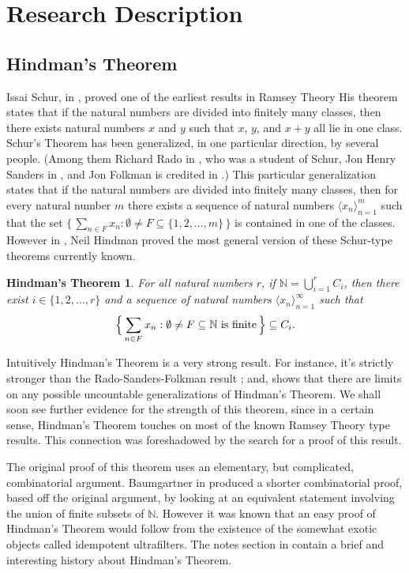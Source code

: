 \documentclass[12pt]{article}
\theoremstyle{plain}
\newtheorem{fst}[thm]{Hindman's Theorem}
\theoremstyle{definition}
\newcommand{\bbN}{\mathbb{N}}
\newcommand{\la}{\langle}
\newcommand{\ra}{\rangle}
\begin{document}
\section{Research Description}
\subsection{Hindman's Theorem}
Issai Schur, in \cite{Schur:1916fk}, proved one of the earliest
results in Ramsey Theory
His theorem states that if the natural numbers are divided into
finitely many classes, then there exists natural numbers $x$ and $y$
such that $x$, $y$, and $x+y$ all lie in one class.
Schur's Theorem has been generalized, in one particular direction, by
several people.
(Among them Richard Rado in \cite{Rado:1933kx}, who was a student of
Schur, Jon Henry Sanders in \cite{Sanders:1968uq}, and Jon Folkman is
credited in \cite{Graham:1971vn}.)
This particular generalization states that if the natural numbers are
divided into finitely many classes, then for every natural number $m$
there exists a sequence of natural numbers $\la x_n \ra_{n=1}^m$ such
that the set $\bigl\{\, \sum_{n \in F} x_n : \emptyset \ne F \subseteq \{1,
2, \ldots, m\} \,\bigr\}$ is contained in one of the classes.
However in \cite{Hindman:1974ys}, Neil Hindman proved the most general
version of these Schur-type theorems currently known. 

  \begin{fst}
    For all natural numbers $r$, if \/ $\bbN = \bigcup_{i=1}^r C_i$, then
    there exist $i \in \{1, 2, \ldots, r\}$ and a sequence of natural
    numbers $\la x_n \ra_{n=1}^\infty$ such that
      \[
        \Bigl\{\, \sum_{n\in F} x_n : \emptyset \ne F \subseteq \bbN
        \hbox{ is finite} \,\Bigr\} \subseteq C_i.
      \]
  \end{fst}

Intuitively Hindman's Theorem is a very strong result.
For instance, it's strictly stronger than the Rado-Sanders-Folkman
result \cite[Theorems 16.28 and 16.29]{Hindman:1998fk}; and,
\cite{Milliken:1978fk} shows that there are limits on any possible
uncountable generalizations of Hindman's Theorem. 
We shall soon see further evidence for the strength of this theorem,
since in a certain sense, Hindman's Theorem touches on most of the
known Ramsey Theory type results. 
This connection was foreshadowed by the search for a proof of this
result. 

The original proof of this theorem uses an elementary, but
complicated, combinatorial argument. 
Baumgartner in \cite{Baumgartner:1974uq} produced a shorter
combinatorial proof, based off the original argument, by looking at an
equivalent statement involving the union of finite subsets of $\bbN$. 
However it was known that an easy proof of Hindman's Theorem would
follow from the existence of the somewhat exotic objects called
idempotent ultrafilters. 
The notes section in \cite[Chapter 5]{Hindman:1998fk} contain a brief
and interesting history about Hindman's Theorem. 
\end{document}
